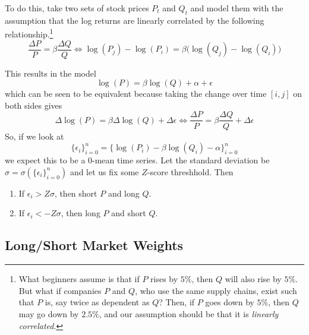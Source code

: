 \documentclass{article}
\begin{document}
  To do this, take two sets of stock prices $P_t$ and $Q_t$ and model them with the assumption that the log returns are linearly correlated by the following relationship.\footnote{What beginners assume is that if $P$ rises by $5\%$, then $Q$ will also rise by $5\%$. But what if companies $P$ and $Q$, who use the same supply chains, exist such that $P$ is, say twice as dependent as $Q$? Then, if $P$ goes down by $5\%$, then $Q$ may go down by $2.5\%$, and our assumption should be that it is \textit{linearly correlated}. }
  \begin{equation}
    \frac{\Delta P}{P} = \beta \frac{\Delta Q}{Q} \iff \log(P_j) - \log(P_i) = \beta \big( \log(Q_j) - \log(Q_i) \big)
  \end{equation}

  This results in the model 
  \begin{equation}
    \log(P) = \beta \log(Q) + \alpha + \epsilon
  \end{equation}
  which can be seen to be equivalent because taking the change over time $[i, j]$ on both sides gives 
  \begin{equation}
    \Delta \log(P) = \beta \Delta \log(Q) + \Delta \epsilon \iff \frac{\Delta P}{P} = \beta \frac{\Delta Q}{Q} + \Delta\epsilon 
  \end{equation}
  So, if we look at
  \begin{equation}
    \{\epsilon_i\}_{i=0}^n = \{\log(P_i) - \beta \log(Q_i) - \alpha\}_{i=0}^n 
  \end{equation}
  we expect this to be a $0$-mean time series. Let the standard deviation be $\sigma = \sigma(\{\epsilon_i\}_{i=0}^n)$ and let us fix some $Z$-score threshhold. Then 
  \begin{enumerate}
    \item If $\epsilon_i > Z \sigma$, then short $P$ and long $Q$. 
    \item If $\epsilon_i < -Z \sigma$, then long $P$ and short $Q$. 
  \end{enumerate}

  \subsection{Long/Short Market Weights}
\end{document}
